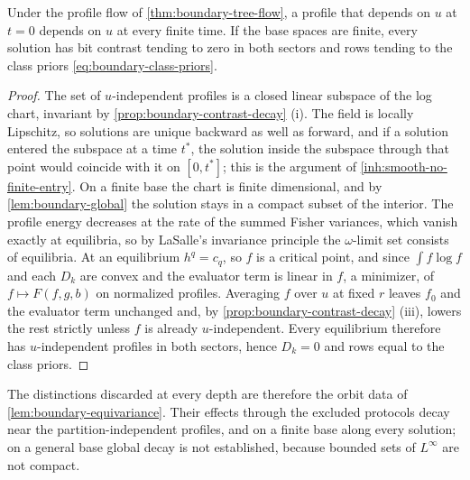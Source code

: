 Under the profile flow of \cref{thm:boundary-tree-flow}, a profile that depends on $u$ at $t=0$ depends on $u$ at every finite time. If the base spaces are finite, every solution has bit contrast tending to zero in both sectors and rows tending to the class priors \cref{eq:boundary-class-priors}.
\begin{proof}
The set of $u$-independent profiles is a closed linear subspace of the log chart, invariant by \cref{prop:boundary-contrast-decay} (i). The field is locally Lipschitz, so solutions are unique backward as well as forward, and if a solution entered the subspace at a time $t^*$, the solution inside the subspace through that point would coincide with it on $[0,t^*]$; this is the argument of \cref{inh:smooth-no-finite-entry}. On a finite base the chart is finite dimensional, and by \cref{lem:boundary-global} the solution stays in a compact subset of the interior. The profile energy decreases at the rate of the summed Fisher variances, which vanish exactly at equilibria, so by LaSalle's invariance principle the $\omega$-limit set consists of equilibria. At an equilibrium $h^q=c_q$, so $f$ is a critical point, and since $\int f\log f$ and each $D_k$ are convex and the evaluator term is linear in $f$, a minimizer, of $f\mapsto F(f,g,b)$ on normalized profiles. Averaging $f$ over $u$ at fixed $r$ leaves $f_0$ and the evaluator term unchanged and, by \cref{prop:boundary-contrast-decay} (iii), lowers the rest strictly unless $f$ is already $u$-independent. Every equilibrium therefore has $u$-independent profiles in both sectors, hence $D_k=0$ and rows equal to the class priors.
\end{proof}

The distinctions discarded at every depth are therefore the orbit data of \cref{lem:boundary-equivariance}. Their effects through the excluded protocols decay near the partition-independent profiles, and on a finite base along every solution; on a general base global decay is not established, because bounded sets of $L^\infty$ are not compact.

